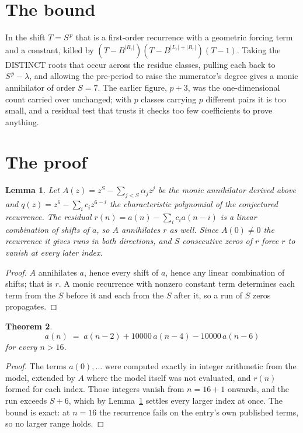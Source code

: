\documentclass[11pt,a4paper]{article}
\theoremstyle{plain}
\newtheorem{theorem}{Theorem}
\newtheorem{lemma}[theorem]{Lemma}
\theoremstyle{definition}
\begin{document}
\section{The bound}

In the shift $T=S^{\,p}$ that is a first-order recurrence with a geometric forcing term and a
constant, killed by $(T-B^{|R_r|})(T-B^{|L_r|+|R_r|})(T-1)$. Taking the DISTINCT roots that
occur across the residue classes, pulling each back to $S^{\,p}-\lambda$, and allowing the
pre-period to raise the numerator's degree gives a monic annihilator of order $S=7$. The
earlier figure, $p+3$, was the one-dimensional count carried over unchanged; with $p$ classes
carrying $p$ different pairs it is too small, and a residual test that trusts it checks too few
coefficients to prove anything.

\section{The proof}

\begin{lemma}\label{lem:crit}
Let $A(z)=z^S-\sum_{j<S}\alpha_jz^{j}$ be the monic annihilator derived above and
$q(z)=z^{6}-\sum_ic_iz^{6-i}$ the characteristic polynomial of the conjectured
recurrence. The residual $r(n)=a(n)-\sum_ic_ia(n-i)$ is a linear combination of shifts of $a$,
so $A$ annihilates $r$ as well. Since $A(0)\ne0$ the recurrence it gives runs in both
directions, and $S$ consecutive zeros of $r$ force $r$ to vanish at every later index.
\end{lemma}

\begin{proof}
$A$ annihilates $a$, hence every shift of $a$, hence any linear combination of shifts; that is
$r$. A monic recurrence with nonzero constant term determines each term from the $S$ before it
and each from the $S$ after it, so a run of $S$ zeros propagates.
\end{proof}

\begin{theorem}
\[
a(n)\;=\;a(n-2) + 10000\,a(n-4) - 10000\,a(n-6)
\]
for every $n>16$.
\end{theorem}

\begin{proof}
The terms $a(0),\dots$ were computed exactly in integer arithmetic from the model, extended by
$A$ where the model itself was not evaluated, and $r(n)$ formed for each index. Those integers
vanish from $n=16+1$ onwards, and the run exceeds $S+6$, which by
Lemma~\ref{lem:crit} settles every larger index at once. The bound is exact: at $n=16$ the recurrence fails on the entry's own published terms, so no larger range holds.
\end{proof}
\end{document}
